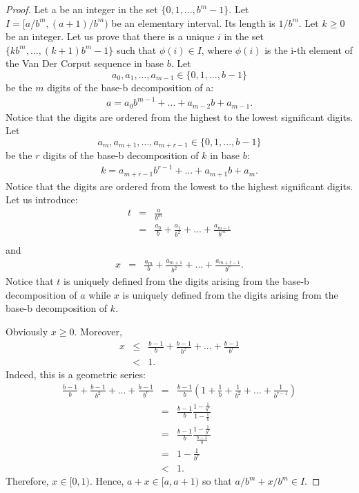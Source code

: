 \begin{proof}
Let a be an integer in the set $\{0,1,...,b^m-1\}$.
Let $I=[a/b^m,(a+1)/b^m)$ be an elementary interval. 
Its length is $1/b^m$. 
Let $k \geq 0$ be an integer. 
Let us prove that there is a unique $i$ in the set $\{kb^m,...,(k+1)b^m-1\}$  
such that $\phi(i) \in I$, where $\phi(i)$ is the i-th element 
of the Van Der Corput sequence in base $b$.
Let 
$$
a_0,a_1,...,a_{m-1} \in \{0,1,...,b-1\}
$$
be the $m$ digits 
of the base-b decomposition of a:
\begin{eqnarray}
a=a_0 b^{m-1}+...+a_{m-2} b+a_{m-1}.
\end{eqnarray}
Notice that the digits are ordered from the highest to the lowest 
significant digits. 
Let 
$$
a_m,a_{m+1},...,a_{m+r-1} \in \{0,1,...,b-1\}
$$
be the $r$ digits of the base-b decomposition of $k$ in base $b$:
\begin{eqnarray}
k=a_{m+r-1}b^{r-1}+...+a_{m+1}b+a_m. \label{vdc-01netdefk}
\end{eqnarray}
Notice that the digits are ordered from the lowest to the highest 
significant digits.
Let us introduce:
\begin{eqnarray}
t&=&\frac{a}{b^m} \\
 &=&\frac{a_0}{b}+\frac{a_1}{b^2}+...+\frac{a_{m-1}}{b^m} \\
\end{eqnarray}
and
\begin{eqnarray}
x&=&\frac{a_m}{b}+\frac{a_{m+1}}{b^2}+...+\frac{a_{m+r-1}}{b^r}.
\end{eqnarray}
Notice that $t$ is uniquely defined from the digits arising from the 
base-b decomposition of $a$ while $x$ is uniquely defined from the digits 
arising from the base-b decomposition of $k$. 

Obviously $x\geq 0$. 
Moreover, 
\begin{eqnarray}
x &\leq& \frac{b-1}{b}+\frac{b-1}{b^2}+...+\frac{b-1}{b^r} \\
  &   <& 1.
\end{eqnarray}
Indeed, this is a geometric series:
\begin{eqnarray}
\frac{b-1}{b}+\frac{b-1}{b^2}+...+\frac{b-1}{b^r}
&=& \frac{b-1}{b}\left(1+\frac{1}{b}+\frac{1}{b^2}+...+\frac{1}{b^{r-1}}\right) \\
&=& \frac{b-1}{b} \frac{1-\frac{1}{b^r}}{1-\frac{1}{b}} \\
&=& \frac{b-1}{b} \frac{1-\frac{1}{b^r}}{\frac{b-1}{b}} \\
&=& 1-\frac{1}{b^r} \\
&<& 1.
\end{eqnarray}
Therefore, $x \in [0,1)$. 
Hence, $a+x \in [a,a+1)$ so that $a/b^m+x/b^m \in I$. 


\end{proof}
